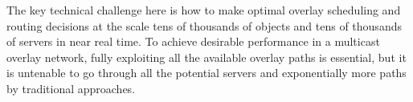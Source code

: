 The key technical challenge here is how to make optimal overlay scheduling and routing decisions at the scale tens of thousands of objects and tens of thousands of servers in near real time. To achieve desirable performance in a multicast overlay network, fully exploiting all the available overlay paths is essential, but it is untenable to go through all the potential servers and exponentially more paths by traditional approaches.

%
%
%
%
%
%



